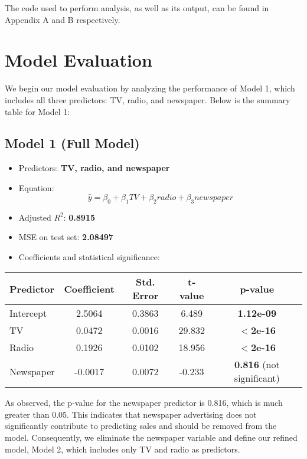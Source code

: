\documentclass{article}
\begin{document}
The code used to perform analysis, as well as its output, can be found in Appendix A and B respectively.


\section{Model Evaluation}

We begin our model evaluation by analyzing the performance of Model 1, which includes all three predictors: TV, radio, and newspaper. Below is the summary table for Model 1:

\subsection{Model 1 (Full Model)}
\begin{itemize}
    \item Predictors: \textbf{TV, radio, and newspaper}
    \item Equation:
    \begin{equation}
        \hat{y} = \beta_0 + \beta_1 TV + \beta_2 radio + \beta_3 newspaper
    \end{equation}
    \item Adjusted $ R^2 $: \textbf{0.8915}
    \item MSE on test set: \textbf{2.08497}
    \item Coefficients and statistical significance:
\end{itemize}

\begin{table}[h]
    \centering
    \begin{tabular}{lcccc}
        \toprule
        Predictor  & Coefficient & Std. Error & t-value & p-value \\
        \midrule
        Intercept  & 2.5064      & 0.3863     & 6.489   & \textbf{1.12e-09} \\
        TV         & 0.0472      & 0.0016     & 29.832  & \textbf{$<$2e-16} \\
        Radio      & 0.1926      & 0.0102     & 18.956  & \textbf{$<$2e-16} \\
        Newspaper  & -0.0017     & 0.0072     & -0.233  & \textbf{0.816} (not significant) \\
        \bottomrule
    \end{tabular}
\end{table}

As observed, the p-value for the newspaper predictor is 0.816, which is much greater than 0.05. This indicates that newspaper advertising does not significantly contribute to predicting sales and should be removed from the model. Consequently, we eliminate the newspaper variable and define our refined model, Model 2, which includes only TV and radio as predictors.
\end{document}
